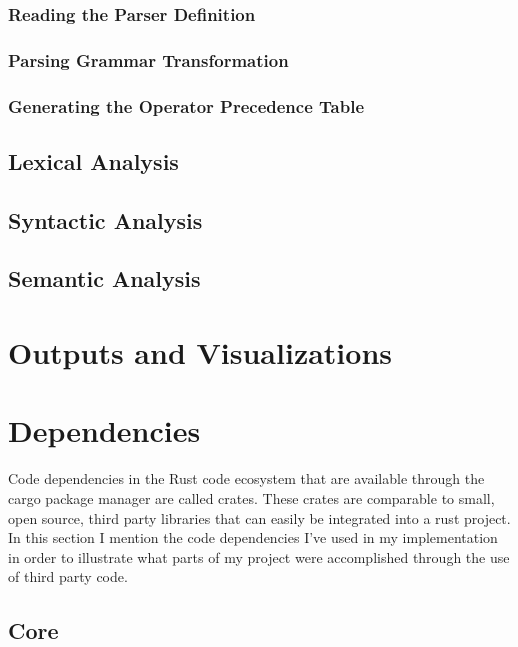\subsubsection{Reading the Parser Definition}

\subsubsection{Parsing Grammar Transformation} \label{parsing_grammar_transformation}

\subsubsection{Generating the Operator Precedence Table}

\subsection{Lexical Analysis}

\subsection{Syntactic Analysis}

\subsection{Semantic Analysis}

\section{Outputs and Visualizations} \label{outputs_and_visualizations}

\section{Dependencies} \label{dependancies}

Code dependencies in the Rust code ecosystem that are  available through the cargo package manager
are called crates. These crates are comparable to small, open source, third party libraries that can
easily be integrated into a rust project. In this section I mention the code dependencies I've used
in my implementation in order to illustrate what parts of my project were accomplished through the
use of third party code.

\subsection{Core}

